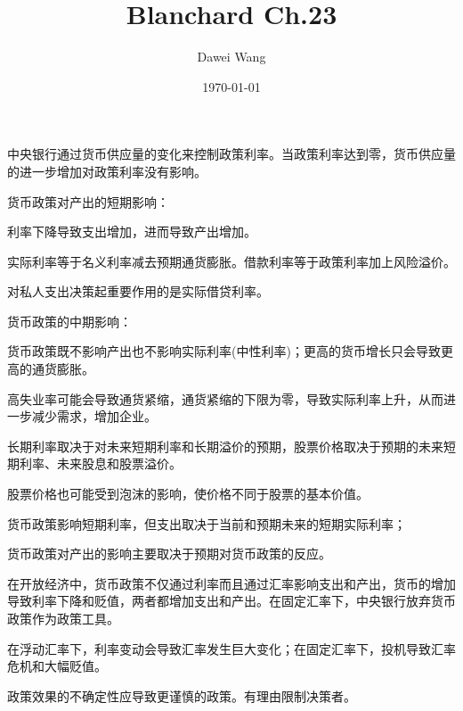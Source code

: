 \documentclass{article}
\title{Blanchard Ch.23}
\author{Dawei Wang}
\date{\today}
\begin{document}
	\maketitle

中央银行通过货币供应量的变化来控制政策利率。当政策利率达到零，货币供应量的进一步增加对政策利率没有影响。

\hspace*{\fill}

货币政策对产出的短期影响：

利率下降导致支出增加，进而导致产出增加。

\hspace*{\fill}

实际利率等于名义利率减去预期通货膨胀。借款利率等于政策利率加上风险溢价。

对私人支出决策起重要作用的是实际借贷利率。

\hspace*{\fill}

货币政策的中期影响：

货币政策既不影响产出也不影响实际利率(中性利率)；更高的货币增长只会导致更高的通货膨胀。

高失业率可能会导致通货紧缩，通货紧缩的下限为零，导致实际利率上升，从而进一步减少需求，增加企业。

\hspace*{\fill}

长期利率取决于对未来短期利率和长期溢价的预期，股票价格取决于预期的未来短期利率、未来股息和股票溢价。

股票价格也可能受到泡沫的影响，使价格不同于股票的基本价值。

\hspace*{\fill}

货币政策影响短期利率，但支出取决于当前和预期未来的短期实际利率；

货币政策对产出的影响主要取决于预期对货币政策的反应。

\hspace*{\fill}

在开放经济中，货币政策不仅通过利率而且通过汇率影响支出和产出，货币的增加导致利率下降和贬值，两者都增加支出和产出。在固定汇率下，中央银行放弃货币政策作为政策工具。

\hspace*{\fill}

在浮动汇率下，利率变动会导致汇率发生巨大变化；在固定汇率下，投机导致汇率危机和大幅贬值。

\hspace*{\fill}

政策效果的不确定性应导致更谨慎的政策。有理由限制决策者。
\end{document}
